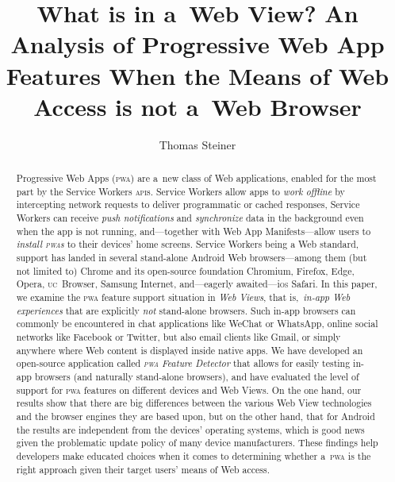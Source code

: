 \documentclass[sigconf,hyphens]{acmart}
\begin{document}
\title[What is in a~Web View?]{What is in a~Web View?
An Analysis of Progressive Web App Features
When the Means of Web Access is not a~Web Browser}  



\author{Thomas Steiner}



\begin{abstract}
Progressive Web Apps (\textsc{pwa}) are a~new class of Web applications,
enabled for the most part by the Service Workers \textsc{api}s.
Service Workers allow apps to \emph{work offline}
by intercepting network requests to deliver programmatic or cached responses,
Service Workers can receive \emph{push notifications}
and \emph{synchronize} data in the background
even when the app is not running,
and---together with Web App Manifests---allow users to \emph{install \textsc{pwa}s}
to their devices' home screens.
Service Workers being a Web standard, support has landed in several
stand-alone Android Web browsers---among them (but not limited to)
Chrome and its open-source foundation Chromium, Firefox, Edge, Opera,
\textsc{uc}~Browser, Samsung Internet, and---eagerly awaited---i\textsc{os} Safari.
In this paper, we examine the \textsc{pwa} feature support situation in \emph{Web Views},
that is,\ \emph{in-app Web experiences} that are explicitly \emph{not} stand-alone browsers.
Such in-app browsers can commonly be encountered in chat applications like WeChat or WhatsApp,
online social networks like Facebook or Twitter, but also email clients like Gmail,
or simply anywhere where Web content is displayed inside native apps.
We have developed an open-source application called \emph{\textsc{pwa} Feature Detector}
that allows for easily testing in-app browsers (and naturally stand-alone browsers),
and have evaluated the level of support for \textsc{pwa} features
on different devices and Web Views.
On the one hand, our results show that there are big differences
between the various Web View technologies
and the browser engines they are based upon,
but on the other hand, that for Android the results
are independent from the devices' operating systems,
which is good news given the problematic update policy of many device manufacturers.
These findings help developers make educated choices when it comes to determining
whether a~\textsc{pwa} is the right approach given their target users' means of Web access.
\end{abstract}
\end{document}
